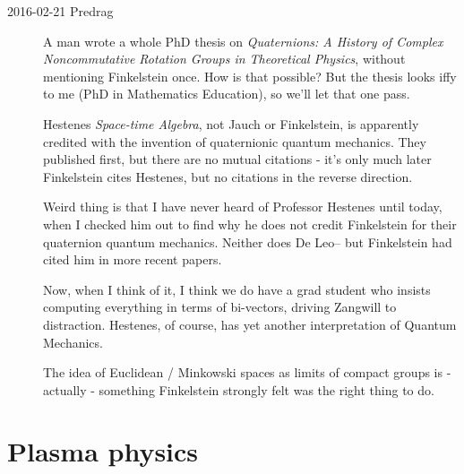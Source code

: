 \begin{description}
\item[2016-02-21 Predrag]
A man wrote a whole PhD thesis
    on {\em Quaternions: A History of Complex Noncommutative Rotation
    Groups in Theoretical Physics}, without mentioning  Finkelstein
    \etal{} once. How is that possible? But the
    thesis looks iffy to me (PhD in Mathematics Education), so we'll
    let that one pass.

Hestenes {\em Space-time Algebra}, not Jauch or
Finkelstein, is apparently credited with the
invention of quaternionic quantum mechanics. They published first, but
there are no mutual citations - it's only much later Finkelstein cites
Hestenes, but no citations in the reverse direction.

Weird thing is that I have never heard of Professor Hestenes until
today, when I checked him out to find why he does not credit
Finkelstein \etal{} for their quaternion quantum
mechanics. Neither does De Leo-- but Finkelstein had cited
him in more recent papers.

Now, when I think of it, I think we do have a grad student who insists
computing everything in terms of bi-vectors, driving Zangwill to
distraction. Hestenes, of course, has yet another interpretation of
Quantum Mechanics.

The idea of Euclidean / Minkowski spaces as limits of compact groups is
- actually - something Finkelstein strongly felt was the right thing to
do.





\end{description}

\section{Plasma physics}
\label{sect:plasma}

